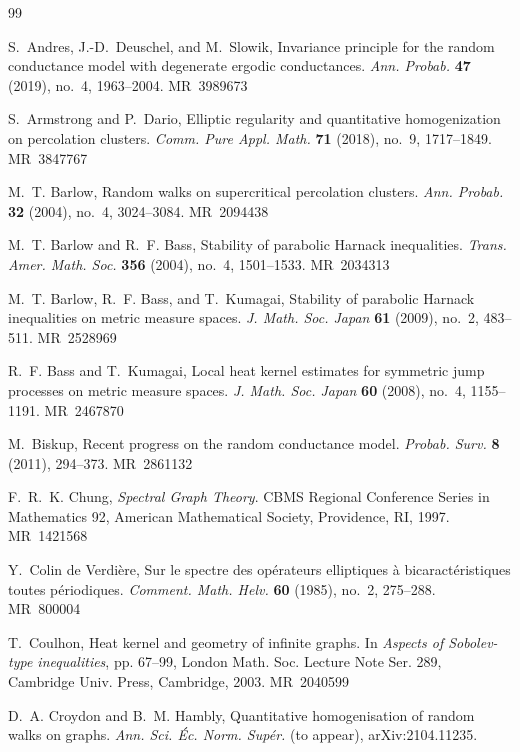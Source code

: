 \documentclass[reqno]{amsart}
\providecommand{\MR}[1]{\textsc{MR}~#1}
\numberwithin{equation}{section}
\theoremstyle{definition}
\theoremstyle{remark}
\begin{document}
\begin{thebibliography}{99}

S.~Andres, J.-D.~Deuschel, and M.~Slowik, Invariance principle for the random conductance model with degenerate ergodic conductances.
\emph{Ann. Probab.} \textbf{47} (2019), no.~4, 1963--2004.
\MR{3989673}


S.~Armstrong and P.~Dario, Elliptic regularity and quantitative homogenization on percolation clusters.
\emph{Comm. Pure Appl. Math.} \textbf{71} (2018), no.~9, 1717--1849.
\MR{3847767}

M.~T. Barlow, Random walks on supercritical percolation clusters.
\emph{Ann. Probab.} \textbf{32} (2004), no.~4, 3024--3084.
\MR{2094438}

M.~T. Barlow and R.~F. Bass, Stability of parabolic Harnack inequalities.
\emph{Trans. Amer. Math. Soc.} \textbf{356} (2004), no.~4, 1501--1533.
\MR{2034313}

M.~T. Barlow, R.~F. Bass, and T.~Kumagai, Stability of parabolic Harnack inequalities on metric measure spaces.
\emph{J. Math. Soc. Japan} \textbf{61} (2009), no.~2, 483--511.
\MR{2528969}

R.~F. Bass and T.~Kumagai, Local heat kernel estimates for symmetric jump processes on metric measure spaces.
\emph{J. Math. Soc. Japan} \textbf{60} (2008), no.~4, 1155--1191.
\MR{2467870}

M.~Biskup, Recent progress on the random conductance model.
\emph{Probab. Surv.} \textbf{8} (2011), 294--373.
\MR{2861132}

F.~R.~K. Chung, \emph{Spectral Graph Theory}.
CBMS Regional Conference Series in Mathematics 92, American Mathematical Society, Providence, RI, 1997.
\MR{1421568}

Y.~Colin de Verdière, Sur le spectre des opérateurs elliptiques à bicaractéristiques toutes périodiques.
\emph{Comment. Math. Helv.} \textbf{60} (1985), no.~2, 275--288.
\MR{800004}

T.~Coulhon, Heat kernel and geometry of infinite graphs.
In \emph{Aspects of Sobolev-type inequalities},
pp. 67--99, London Math. Soc. Lecture Note Ser. 289,
Cambridge Univ. Press, Cambridge, 2003.
\MR{2040599}


D.~A. Croydon and B.~M. Hambly, Quantitative homogenisation of random walks on graphs.
\emph{Ann. Sci. Éc. Norm. Supér.} (to appear), arXiv:2104.11235.


\end{thebibliography}
\end{document}
